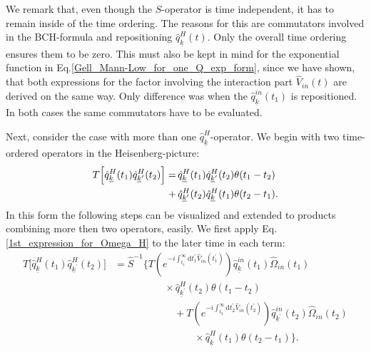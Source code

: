 \documentclass[
12pt, %
english, %
singlespacing, %
headsepline, %
]{MastersDoctoralThesis} %
\begin{document}
We remark that, even though the $ \hat{S} $-operator is time independent, it has to remain inside of the time ordering. The reasons for this are commutators involved in the BCH-formula and repositioning $ \hat{q}^{H}_{\underline{k}}(t) $. Only the overall time ordering ensures them to be zero. This must also be kept in mind for the exponential function in Eq.\enskip\eqref{Gell_Mann-Low_for_one_Q_exp_form}, since we have shown, that both expressions for the factor involving the interaction part $  \hat{V}_{in}(t) $ are derived on the same way. Only difference was when the $ \hat{q}^{in}_{\underline{k}}(t_1) $ is repositioned. In both cases the same commutators have to be evaluated.

Next, consider the case with more than one $ \hat{q}^{H}_{\underline{k}} $-operator. We begin with two time-ordered operators in the Heisenberg-picture:
\begin{equation}
\begin{split}
T\Big[
\hat{q}^{H}_{\underline{k}}(t_1)
\hat{q}^{H}_{\underline{k}^{\prime}}(t_2)
\Big]
=&
\thinspace
\hat{q}^{H}_{\underline{k}}(t_1)
\hat{q}^{H}_{\underline{k}^{\prime}}(t_2)
\theta(t_{1}-t_{2})
\\
\thinspace\thinspace
+&
\thinspace
\hat{q}^{H}_{\underline{k}^{\prime}}(t_2)
\hat{q}^{H}_{\underline{k}}(t_1)
\theta(t_{2}-t_{1})
.
\end{split}
\end{equation}
In this form the following steps can be visualized and extended to products combining more then two operators, easily. We first apply Eq.\enskip\eqref{1st_expression_for_Omega_H} to the later time in each term:
\begin{equation}
\begin{split}
T\Big[
\hat{q}^{H}_{\underline{k}}(t_1)
\hat{q}^{H}_{\underline{k}^{\prime}}(t_2)
\Big]
&=
\hat{S}^{-1}
\Big\{
T\left(  e^{-i\int_{t_{1}}^{\infty}\mathrm{d}t^{\prime}_{1} \hat{V}_{in}(t_{1}^{\prime})}\right)\hat{q}^{in}_{\underline{k}}(t_1)\hat{\Omega}_{in}(t_1)
\\
&\quad\quad\quad\quad\quad\times
 \hat{q}^{H}_{\underline{k}^{\prime}}(t_2)   \theta(t_1 - t_2)
		\\
    &\quad\quad\quad\quad\quad\quad+ T\left(  e^{-i\int_{t_{2}}^{\infty}\mathrm{d}t^{\prime}_{2} \hat{V}_{in}(t_{2}^{\prime})}\right)\hat{q}^{in}_{\underline{k}^{\prime}}(t_2)\hat{\Omega}_{in}(t_2) 
\\
&\quad\quad\quad\quad\quad\quad\quad\quad\times     
      \hat{q}^{H}_{\underline{k}}(t_1)   \theta(t_2 - t_1)
    \Big\}
    .  
    \end{split} 
\end{equation}
\end{document}
